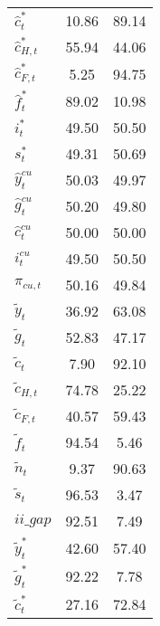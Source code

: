 \begin{center}
\begin{longtable}{lcc}
${\hat c_t^*}             $	 & 	             10.86	 & 	             89.14 \\ 
${\hat c_{H,t}^*}         $	 & 	             55.94	 & 	             44.06 \\ 
${\hat c_{F,t}^*}         $	 & 	              5.25	 & 	             94.75 \\ 
${\hat f_t^*}             $	 & 	             89.02	 & 	             10.98 \\ 
${i_t^*}                  $	 & 	             49.50	 & 	             50.50 \\ 
${s_t^*}                  $	 & 	             49.31	 & 	             50.69 \\ 
${\hat y_t^{cu}}          $	 & 	             50.03	 & 	             49.97 \\ 
${\hat g_t^{cu}}          $	 & 	             50.20	 & 	             49.80 \\ 
${\hat c_t^{cu}}          $	 & 	             50.00	 & 	             50.00 \\ 
${i_t^{cu}}               $	 & 	             49.50	 & 	             50.50 \\ 
${\pi_{cu,t}}             $	 & 	             50.16	 & 	             49.84 \\ 
${\tilde y_t}             $	 & 	             36.92	 & 	             63.08 \\ 
${\tilde g_t}             $	 & 	             52.83	 & 	             47.17 \\ 
${\tilde c_t}             $	 & 	              7.90	 & 	             92.10 \\ 
${\tilde c_{H,t}}         $	 & 	             74.78	 & 	             25.22 \\ 
${\tilde c_{F,t}}         $	 & 	             40.57	 & 	             59.43 \\ 
${\tilde f_t}             $	 & 	             94.54	 & 	              5.46 \\ 
${\tilde n_t}             $	 & 	              9.37	 & 	             90.63 \\ 
${\tilde s_t}             $	 & 	             96.53	 & 	              3.47 \\ 
$ii\_gap                  $	 & 	             92.51	 & 	              7.49 \\ 
${\tilde y_t^*}           $	 & 	             42.60	 & 	             57.40 \\ 
${\tilde g_t^*}           $	 & 	             92.22	 & 	              7.78 \\ 
${\tilde c_t^*}           $	 & 	             27.16	 & 	             72.84 \\ 

\end{longtable}
\end{center}
